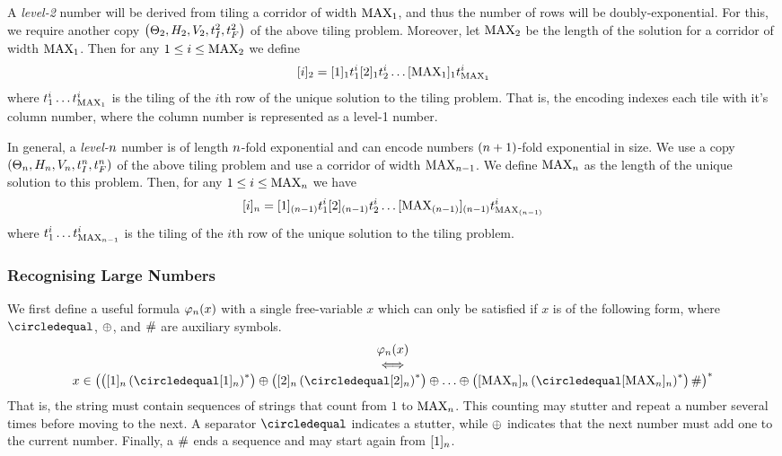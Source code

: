 A \emph{level-2} number will be derived from tiling a corridor of width $\nmax{1}$, and thus the number of rows will be doubly-exponential.
For this, we require another copy
$\tup{\tilesnum{2}, \hrelnum{2}, \vrelnum{2}, \inittilenum{2}, \fintilenum{2}}$
of the above tiling problem.
Moreover, let $\nmax{2}$ be the length of the solution for a corridor of width $\nmax{1}$.
Then for any
$1 \leq i \leq \nmax{2}$
we define
\[
    \tenc{2}{i} =
        \tenc{1}{1} \tile^i_1
        \tenc{1}{2} \tile^i_2
        \ldots
        \tenc{1}{\nmax{1}} \tile^i_{\nmax{1}}
\]
where
$\tile^i_1 \ldots \tile^i_{\nmax{1}}$
is the tiling of the $i$th row of the unique solution to the tiling problem.
That is, the encoding indexes each tile with it's column number, where the column number is represented as a level-1 number.

In general, a \emph{level-$\expheight$} number is of length $\expheight$-fold exponential and can encode numbers $(\expheight+1)$-fold exponential in size.
We use a copy
$\tup{\tilesnum{\expheight},
      \hrelnum{\expheight},
      \vrelnum{\expheight},
      \inittilenum{\expheight},
      \fintilenum{\expheight}}$
of the above tiling problem and use a corridor of width
$\nmax{\expheight-1}$.
We define $\nmax{\expheight}$ as the length of the unique solution to this problem.
Then, for any $1 \leq i \leq \nmax{\expheight}$ we have
\[
    \tenc{\expheight}{i} =
        \tenc{(\expheight-1)}{1} \tile^i_1
        \tenc{(\expheight-1)}{2} \tile^i_2
        \ldots
        \tenc{(\expheight-1)}{\nmax{(\expheight-1)}} \tile^i_{\nmax{(\expheight-1)}}
\]
where
$\tile^i_1 \ldots \tile^i_{\nmax{\expheight-1}}$
is the tiling of the $i$th row of the unique solution to the tiling problem.

\subsubsection{Recognising Large Numbers}

We first define a useful formula
$\goodnums{\expheight}{x}$
with a single free-variable $x$ which can only be satisfied if $x$ is of the following form, where
$\numeq$, $\numplus$, and $\numsep$
are auxiliary symbols.
\[
    \begin{array}{c}
        \goodnums{\expheight}{x} \\
        \iff \\
        x \in \brac{
            \brac{\tenc{\expheight}{1} \brac{\numeq \tenc{\expheight}{1}}^\ast}
            \numplus
            \brac{\tenc{\expheight}{2} \brac{\numeq \tenc{\expheight}{2}}^\ast}
            \numplus
            \ldots
            \numplus
            \brac{
                \tenc{\expheight}{\nmax{\expheight}}
                    \brac{\numeq \tenc{\expheight}{\nmax{\expheight}}}^\ast
            }
            \numsep
        }^\ast
    \end{array}
\]
That is, the string must contain sequences of strings that count from $1$ to $\nmax{\expheight}$.
This counting may stutter and repeat a number several times before moving to the next.
A separator $\numeq$ indicates a stutter, while $\numplus$ indicates that the next number must add one to the current number.
Finally, a $\numsep$ ends a sequence and may start again from $\tenc{\expheight}{1}$.

